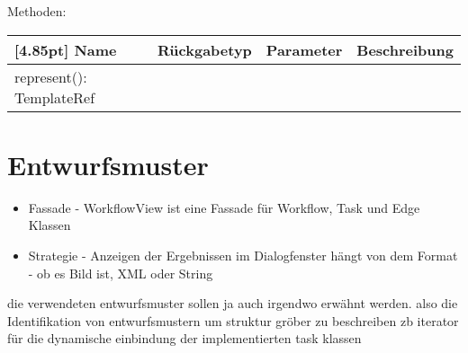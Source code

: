                 Methoden:
        		\begin{center}
                \setlength\tabcolsep{5pt}
                	\renewcommand{\arraystretch}{1.5}
                    	\begin{tabularx}{\textwidth}{|l|l|l|X|}
                    	\hline
                    	\rowcolor[gray]{0.75}[4.85pt]
                		Name & Rückgabetyp & Parameter & Beschreibung \\ \hline
                		represent(): TemplateRef
                        & & &  \\ \hline
                        \end{tabularx}
        		\end{center}
	
	\section{Entwurfsmuster}
	
	\begin{itemize}
	    \item Fassade - WorkflowView ist eine Fassade für Workflow, Task und Edge Klassen
	    \item Strategie - Anzeigen der Ergebnissen im Dialogfenster hängt von dem Format - ob es Bild ist, XML oder String 
	\end{itemize}
	
	die verwendeten entwurfsmuster sollen ja auch irgendwo erwähnt werden.
	also die Identifikation von entwurfsmustern um struktur gröber zu beschreiben
	zb iterator für die dynamische einbindung der implementierten task klassen
